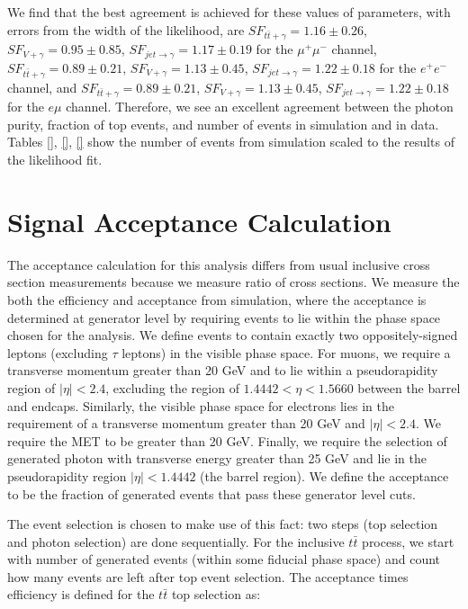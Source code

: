 We find that the best agreement is achieved for these values of parameters, with errors from the width of the likelihood, are $SF_{t\bar{t}+\gamma} = 1.16 \pm 0.26$, $SF_{V+\gamma} = 0.95 \pm 0.85$, $SF_{jet\to\gamma} = 1.17 \pm 0.19$ for the $\mu^+\mu^-$ channel, $SF_{t\bar{t}+\gamma} = 0.89 \pm 0.21$, $SF_{V+\gamma} = 1.13 \pm 0.45$, $SF_{jet\to\gamma} = 1.22 \pm  0.18$ for the $e^+e^-$ channel, and $SF_{t\bar{t}+\gamma} = 0.89 \pm 0.21$, $SF_{V+\gamma} = 1.13 \pm 0.45$, $SF_{jet\to\gamma} = 1.22 \pm 0.18$ for the $e\mu$ channel. Therefore, we see an excellent agreement between the photon purity, fraction of top events, and number of events in simulation and in data. Tables \ref{}, \ref{}, \ref{} show the number of events from simulation scaled to the results of the likelihood fit.  


\section{Signal Acceptance Calculation} \label{subsec-SignalAcceptanceCalculation}



The acceptance calculation for this analysis differs from usual inclusive cross section measurements because we measure ratio of cross sections. We measure the both the efficiency and acceptance from simulation, where the acceptance is determined at generator level by requiring events to lie within the phase space chosen for the analysis. We define events to contain exactly two oppositely-signed leptons (excluding $\tau$ leptons) in the visible phase space. For muons, we require a transverse momentum greater than 20 GeV and to lie within a pseudorapidity region of $|\eta| < 2.4$, excluding the region of $1.4442 < \eta < 1.5660$ between the barrel and endcaps. Similarly, the visible phase space for electrons lies in the requirement of a transverse momentum greater than 20 GeV and $|\eta| < 2.4$. We require the MET to be greater than 20 GeV. Finally, we require the selection of generated photon with transverse energy greater than 25 GeV and lie in the pseudorapidity region $|\eta| < 1.4442$ (the barrel region). We define the acceptance to be the fraction of generated events that pass these generator level cuts. 


The event selection is chosen to make use of this fact: two steps (top selection and photon selection) are done sequentially. For the inclusive $t\bar{t}$ process, we start with number of generated events (within some fiducial phase space) and count how many events are left after top event selection. The acceptance times efficiency is defined for the $t\bar{t}$ top selection as:

